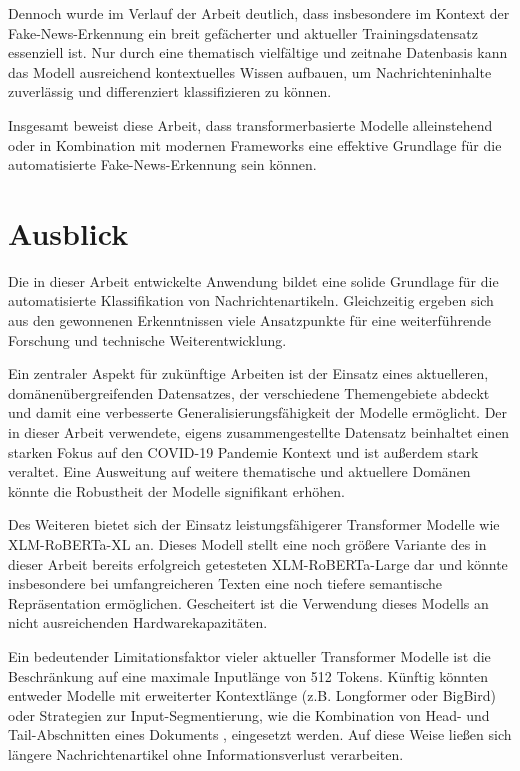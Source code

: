 Dennoch wurde im Verlauf der Arbeit deutlich, dass insbesondere im Kontext der Fake-News-Erkennung ein breit gefächerter und aktueller Trainingsdatensatz essenziell ist.
Nur durch eine thematisch vielfältige und zeitnahe Datenbasis kann das Modell ausreichend kontextuelles Wissen aufbauen, um Nachrichteninhalte zuverlässig und differenziert 
klassifizieren zu können.

Insgesamt beweist diese Arbeit, dass transformerbasierte Modelle alleinstehend oder in Kombination mit modernen Frameworks eine effektive Grundlage 
für die automatisierte Fake-News-Erkennung sein können.

\chapter{Ausblick}
\label{chap:ausblick}

Die in dieser Arbeit entwickelte Anwendung bildet eine solide Grundlage für die automatisierte Klassifikation von Nachrichtenartikeln. 
Gleichzeitig ergeben sich aus den gewonnenen Erkenntnissen viele Ansatzpunkte für eine weiterführende Forschung und technische Weiterentwicklung.

Ein zentraler Aspekt für zukünftige Arbeiten ist der Einsatz eines aktuelleren, domänenübergreifenden Datensatzes, der verschiedene Themengebiete abdeckt 
und damit eine verbesserte Generalisierungsfähigkeit der Modelle ermöglicht. Der in dieser Arbeit verwendete, eigens zusammengestellte Datensatz 
beinhaltet einen starken Fokus auf den COVID-19 Pandemie Kontext und ist außerdem stark veraltet. 
Eine Ausweitung auf weitere thematische und aktuellere Domänen könnte die Robustheit der Modelle signifikant erhöhen.

Des Weiteren bietet sich der Einsatz leistungsfähigerer Transformer Modelle wie XLM-RoBERTa-XL an. Dieses Modell stellt eine noch größere Variante des in 
dieser Arbeit bereits erfolgreich getesteten XLM-RoBERTa-Large dar und könnte insbesondere bei umfangreicheren Texten eine noch tiefere semantische 
Repräsentation ermöglichen. Gescheitert ist die Verwendung dieses Modells an nicht ausreichenden Hardwarekapazitäten.

Ein bedeutender Limitationsfaktor vieler aktueller Transformer Modelle ist die Beschränkung auf eine maximale Inputlänge von 512 Tokens. 
Künftig könnten entweder Modelle mit erweiterter Kontextlänge (z.B. Longformer oder BigBird) oder Strategien zur Input-Segmentierung, 
wie die Kombination von Head- und Tail-Abschnitten eines Dokuments \cite{sun2020finetuneberttextclassification}, eingesetzt werden. 
Auf diese Weise ließen sich längere Nachrichtenartikel ohne Informationsverlust verarbeiten.

